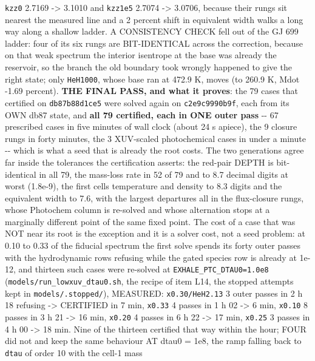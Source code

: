 \documentclass[english,a4paper]{my_memo}
\begin{document}
\begin{itemize}
  \texttt{kzz0} 2.7169 -\textgreater{} 3.1010 and \texttt{kzz1e5} 2.7074 -\textgreater{} 3.0706, because their rungs
  sit nearest the measured line and a 2 percent shift in equivalent width walks
  a long way along a shallow ladder. A CONSISTENCY CHECK fell out of the GJ 699
  ladder: four of its six rungs are BIT-IDENTICAL across the correction,
  because on that weak spectrum the interior isentrope at the base was already
  the reservoir, so the branch the old boundary took wrongly happened to give
  the right state; only \texttt{HeH1000}, whose base ran at 472.9 K, moves (to
  260.9 K, Mdot -1.69 percent). \textbf{THE FINAL PASS, and what it proves}: the 79
  cases that certified on \texttt{db87b88d1ce5} were solved again on \texttt{c2e9c9990b9f},
  each from its OWN db87 state, and \textbf{all 79 certified, each in ONE outer
  pass} -\/- 67 prescribed cases in five minutes of wall clock (about 24 s
  apiece), the 9 closure rungs in forty minutes, the 3 XUV-scaled photochemical
  cases in under a minute -\/- which is what a seed that is already the root
  costs. The two generations agree far inside the tolerances the certification
  asserts: the red-pair DEPTH is bit-identical in all 79, the mass-loss rate in
  52 of 79 and to 8.7 decimal digits at worst (1.8e-9), the first cell\textquotesingle s
  temperature and density to 8.3 digits and the equivalent width to 7.6, with
  the largest departures all in the flux-closure rungs, whose Photochem column
  is re-solved and whose alternation stops at a marginally different point of
  the same fixed point. The cost of a case that was NOT near its root is the
  exception and it is a solver cost, not a seed problem: at 0.10 to 0.33 of the
  fiducial spectrum the first solve spends its forty outer passes with the
  hydrodynamic rows refusing while the gated species row is already at 1e-12,
  and thirteen such cases were re-solved at \texttt{EXHALE\_PTC\_DTAU0=1.0e8}
  (\texttt{models/run\_lowxuv\_dtau0.sh}, the recipe of item L14, the stopped attempts
  kept in \texttt{models/.stopped/}), MEASURED: \texttt{x0.30/HeH2.13} 3 outer passes in
  2 h 18 refusing -\textgreater{} CERTIFIED in 7 min, \texttt{x0.33} 4 passes in 1 h 02 -\textgreater{}
  6 min, \texttt{x0.10} 8 passes in 3 h 21 -\textgreater{} 16 min, \texttt{x0.20} 4 passes in 6 h 22 -\textgreater{}
  17 min, \texttt{x0.25} 3 passes in 4 h 00 -\textgreater{} 18 min. Nine of the thirteen certified
  that way within the hour; FOUR did not and keep the same behaviour AT
  dtau0 = 1e8, the ramp falling back to \texttt{dtau} of order 10 with the cell-1 mass

\end{itemize}
\end{document}
